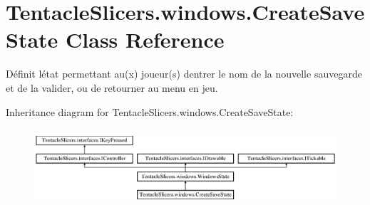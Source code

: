 \hypertarget{class_tentacle_slicers_1_1windows_1_1_create_save_state}{}\section{Tentacle\+Slicers.\+windows.\+Create\+Save\+State Class Reference}
\label{class_tentacle_slicers_1_1windows_1_1_create_save_state}


Définit l\textquotesingle{}état permettant au(x) joueur(s) d\textquotesingle{}entrer le nom de la nouvelle sauvegarde et de la valider, ou de retourner au menu en jeu.  


Inheritance diagram for Tentacle\+Slicers.\+windows.\+Create\+Save\+State\+:\begin{figure}[H]
\begin{center}
\leavevmode
\includegraphics[height=2.894057cm]{class_tentacle_slicers_1_1windows_1_1_create_save_state}
\end{center}
\end{figure}
